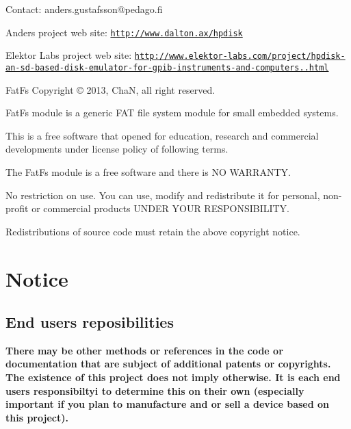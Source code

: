 Contact\-: anders.\-gustafsson@pedago.\-fi\par
 Anders project web site\-: \href{http://www.dalton.ax/hpdisk}{\tt http\-://www.\-dalton.\-ax/hpdisk}\par
 Elektor Labs project web site\-: \href{http://www.elektor-labs.com/project/hpdisk-an-sd-based-disk-emulator-for-gpib-instruments-and-computers.13693.html}{\tt http\-://www.\-elektor-\/labs.\-com/project/hpdisk-\/an-\/sd-\/based-\/disk-\/emulator-\/for-\/gpib-\/instruments-\/and-\/computers..\-html}





\begin{DoxyParagraph}{Fat\-Fs Copyright \copyright{} 2013, Cha\-N, all right reserved.}

\end{DoxyParagraph}
Fat\-Fs module is a generic F\-A\-T file system module for small embedded systems.

This is a free software that opened for education, research and commercial developments under license policy of following terms.


\begin{DoxyItemize}
\item The Fat\-Fs module is a free software and there is N\-O W\-A\-R\-R\-A\-N\-T\-Y.
\item No restriction on use. You can use, modify and redistribute it for personal, non-\/profit or commercial products U\-N\-D\-E\-R Y\-O\-U\-R R\-E\-S\-P\-O\-N\-S\-I\-B\-I\-L\-I\-T\-Y.
\item Redistributions of source code must retain the above copyright notice.
\end{DoxyItemize}





\section*{Notice}

\subsection*{End users reposibilities}

{\bfseries There may be other methods or references in the code or documentation that are subject of additional patents or copyrights. The existence of this project does not imply otherwise. It is each end users responsibiltyi to determine this on their own (especially important if you plan to manufacture and or sell a device based on this project).} 